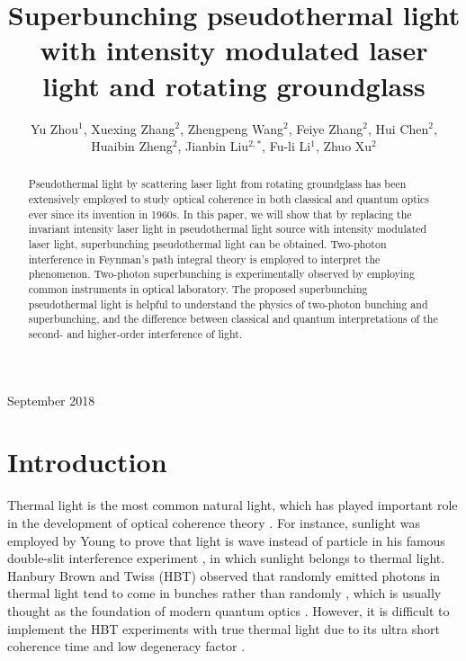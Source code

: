 \documentclass[12pt]{iopart}
\begin{document}
\title[Superbunching pseudothermal light]{Superbunching pseudothermal light with intensity modulated laser light and rotating groundglass}

\author{Yu Zhou$^1$, Xuexing Zhang$^2$, Zhengpeng Wang$^2$, Feiye Zhang$^2$, Hui Chen$^2$, Huaibin Zheng$^2$, Jianbin Liu$^{2,*}$, Fu-li Li$^1$, Zhuo Xu$^2$}

\address{$^1$ MOE Key Laboratory for Nonequilibrium Synthesis and Modulation of Condensed Matter, Department of Applied Physics, Xi'an Jiaotong University, Xi'an 710049, China}
\address{$^2$ Electronic Materials Research Laboratory, Key Laboratory of the Ministry of Education \& International Center for Dielectric Research, School of Electronic and Information Engineering, Xi'an Jiaotong University, Xi'an 710049, China}

\vspace{10pt}
\begin{indented}
\item[]September 2018
\end{indented}

\begin{abstract}
Pseudothermal light by scattering laser light from rotating groundglass has been extensively employed to study optical coherence in both classical and quantum optics ever since its invention in 1960s.  In this paper, we will show that by replacing the invariant intensity laser light in pseudothermal light source with intensity modulated laser light, superbunching pseudothermal light can be obtained. Two-photon interference in Feynman's path integral theory is employed to interpret the phenomenon. Two-photon superbunching is experimentally observed by employing common instruments in optical laboratory. The proposed superbunching pseudothermal light is helpful to understand the physics of two-photon bunching and superbunching, and the difference between classical and quantum interpretations of the second- and higher-order interference of light.
\end{abstract}


\submitto{\NJP}


\section{Introduction}

Thermal light is the most common natural light, which has played important role in the development of optical coherence theory \cite{mandel-book}. For instance, sunlight was employed by Young to prove that light is wave instead of particle in his famous double-slit interference experiment \cite{young}, in which sunlight belongs to thermal light. Hanbury Brown and Twiss (HBT) observed that randomly emitted photons in thermal light tend to come in bunches rather than randomly \cite{HBT}, which is usually thought as the foundation of modern quantum optics \cite{glauber}. However, it is difficult to implement the HBT experiments with true thermal light due to its ultra short coherence time and low degeneracy factor \cite{mandel-book,HBT-2}. 
\end{document}
